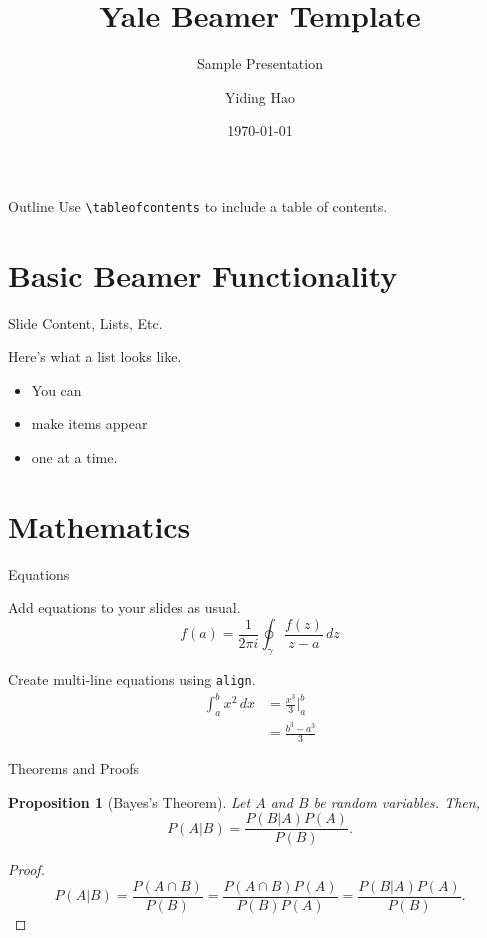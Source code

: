\documentclass{beamer}
\title{Yale Beamer Template}
\subtitle{Sample Presentation}
\author{Yiding Hao}
\institute{\textsc{department of linguistics $\cdot$ yale university}}
\date{\today}
\newtheorem{proposition}[equation]{Proposition}
\theoremstyle{definition}
\theoremstyle{example}
\begin{document}
	
\frame{
	\titlepage
}
	
\begin{frame}{Outline}
	Use \texttt{\textbackslash tableofcontents} to include a table of contents.
	\tableofcontents
\end{frame}

\section{Basic Beamer Functionality}

\begin{frame}{Slide Content, Lists, Etc.}

	Here's what a list looks like.\pause
	\begin{itemize}[<+->]
		\item You can
		\item make items appear
		\item one at a time.
	\end{itemize}

	\begin{center}
	\end{center}
	
\end{frame}



\section{Mathematics}

\begin{frame}{Equations}

	Add equations to your slides as usual.
	\[
	f(a) = \frac{1}{2\pi i} \oint_\gamma \frac{f(z)}{z - a} \, dz
	\]
	
	Create multi-line equations using \texttt{align}.
	\begin{align*}
		\int_a^b x^2 \, dx &= \frac{x^3}{3} \Big|_a^b \\
		&= \frac{b^3 - a^3}{3}
	\end{align*}


\end{frame}

\begin{frame}{Theorems and Proofs}

\begin{proposition}[Bayes's Theorem]
	Let $A$ and $B$ be random variables. Then,
	\[
	P(A|B) = \frac{P(B|A)P(A)}{P(B)}.
	\]
\end{proposition} 
\begin{proof}
	\[
	P(A|B) = \frac{P(A\cap B)}{P(B)} = \frac{P(A\cap B)P(A)}{P(B)P(A)} = \frac{P(B|A)P(A)}{P(B)}.
	\]
\end{proof}

\end{frame}
\end{document}
